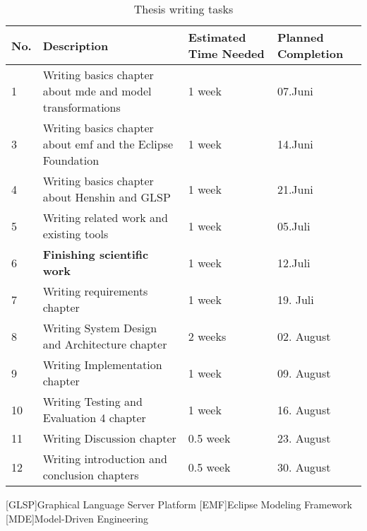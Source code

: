 \documentclass[conference,onecolumn]{IEEEtran}
\begin{document}
  \begin{table}[h!]
    \centering
    \caption{Thesis writing tasks}
    \begin{tabular}{|p{0.5cm}|p{8cm}|l|l|}
      \hline
      \textbf{No.} & \textbf{Description} & \textbf{Estimated Time Needed} & \textbf{Planned Completion} \\
      \hline
      1 & Writing basics chapter about \ac{mde} and model transformations & 1 week & 07.Juni \\
      3 & Writing basics chapter about \ac{emf} and the Eclipse Foundation & 1 week & 14.Juni \\
      4 & Writing basics chapter about Henshin and GLSP & 1 week & 21.Juni \\ 
      5 & Writing related work and existing tools & 1 week & 05.Juli \\ 
      6 & \textbf{Finishing scientific work} & 1 week & 12.Juli \\
      7 & Writing requirements chapter & 1 week & 19. Juli \\ 
      8 & Writing System Design and Architecture chapter & 2 weeks & 02. August \\ 
      9 & Writing Implementation chapter & 1 week & 09. August \\ 
      10 & Writing Testing and Evaluation 4 chapter & 1 week & 16. August \\ 
      11 & Writing Discussion chapter & 0.5 week & 23. August \\ 
      12 & Writing introduction and conclusion chapters & 0.5 week & 30. August \\ 
      \hline
    \end{tabular}
  \end{table}


  \printbibliography

\begin{acronym}
  [GLSP]{Graphical Language Server Platform}
  [EMF]{Eclipse Modeling Framework}
  [MDE]{Model-Driven Engineering}
\end{acronym}
\end{document}
